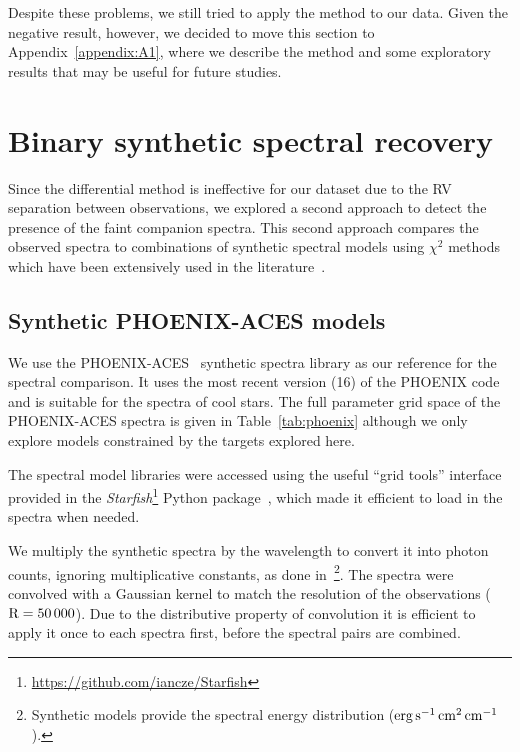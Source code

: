 \documentclass[fleqn,usenatbib]{mnras}
\begin{document}
Despite these problems, we still tried to apply the method to our data. Given the negative result, however, we decided to move this section to Appendix~\ref{appendix:A1}, where we describe the method and some exploratory results that may be useful for future studies.


\section{Binary synthetic spectral recovery}
\label{subsec:companion_recovery}
Since the differential method is ineffective for our dataset due to the RV separation between observations, we explored a second approach to detect the presence of the faint companion spectra. This second approach compares the observed spectra to combinations of synthetic spectral models using \(\chi^{2}\) methods which have been extensively used in the literature~\citep[e.g.][]{astudillo-defru_harps_2015, passegger_fundamental_2016, zechmeister_spectrum_2018,nemravova_xtauri_2016}.


\subsection{Synthetic PHOENIX-ACES models}
\label{subsec:spec_models}
We use the PHOENIX-ACES~\citep{husser_new_2013} synthetic spectra library as our reference for the spectral comparison. It uses the most recent version (16) of the PHOENIX code and is suitable for the spectra of cool stars. The full parameter grid space of the PHOENIX-ACES spectra is given in Table~\ref{tab:phoenix} although we only explore models constrained by the targets explored here.



The spectral model libraries were accessed using the useful ``grid tools'' interface provided in the \emph{Starfish}\footnote{\url{https://github.com/iancze/Starfish}} Python package~\citep{czekala_constructing_2015}, which made it efficient to load in the spectra when needed.

We multiply the synthetic spectra by the wavelength to convert it into photon counts, ignoring multiplicative constants, as done in~\citet{figueira_radial_2016}\footnote{Synthetic models provide the spectral energy distribution (\(\rm erg\,s^{-1}\,cm^{2}\,cm^{-1}\)).}. The spectra were convolved with a Gaussian kernel to match the resolution of the observations (\(\rm R=50\,000\)). Due to the distributive property of convolution it is efficient to apply it once to each spectra first, before the spectral pairs are combined.
\end{document}
